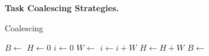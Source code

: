 \noindent \textbf{Task Coalescing Strategies.} 

%
%
\begin{algorithm}[t]
	\caption{Coalescing}
	\label{algo:genCoalescing}
	\scriptsize
	\begin{algorithmic}[1]
        \State $B \leftarrow $ 
        \State $H \gets 0$ 
	        \State $ i \gets 0$
		        \State {}
		        \State $W \leftarrow $ 
		        \State $i \gets i + W$
				\State $H \gets H + W$
	        \EndWhile
	        \State {}
	        \State $B \leftarrow $ 
        \EndWhile
	\end{algorithmic}
\end{algorithm}
